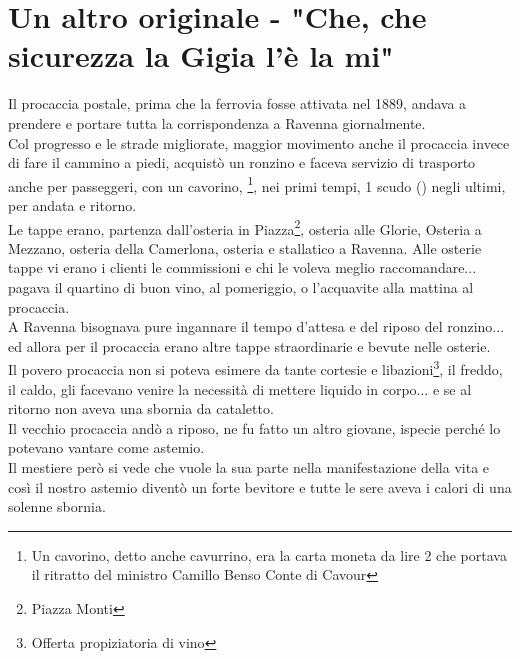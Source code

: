 
\chapter{Un altro originale - "Che, che sicurezza la Gigia l'è la mi"}
Il procaccia postale, prima che la ferrovia fosse attivata nel 1889, andava a prendere e portare tutta la corrispondenza a Ravenna giornalmente.\\
Col progresso e le strade migliorate, maggior movimento anche il procaccia invece di fare il cammino a piedi, acquistò un ronzino e faceva servizio di trasporto anche per passeggeri, con un cavorino, \normalfont \:\:\footnote{Un cavorino, detto anche cavurrino, era la carta moneta da lire 2 che portava il ritratto del ministro Camillo Benso Conte di Cavour}, nei primi tempi, 1 scudo (\normalfont \:\:) negli ultimi, per andata e ritorno. \\
Le tappe erano, partenza dall'osteria in Piazza\footnote{Piazza Monti}, osteria alle Glorie, Osteria a Mezzano, osteria della Camerlona, osteria e stallatico a Ravenna. Alle osterie tappe vi erano i clienti le commissioni e chi le voleva meglio raccomandare... pagava il quartino di buon vino, al pomeriggio, o l'acquavite alla mattina al procaccia.\\
A Ravenna bisognava pure ingannare il tempo d'attesa e del riposo del ronzino... ed allora per il procaccia erano altre tappe straordinarie e bevute nelle osterie.\\
Il povero procaccia non si poteva esimere da tante cortesie e libazioni\footnote{Offerta propiziatoria di vino}, il freddo, il caldo, gli facevano venire la necessità di mettere liquido in corpo... e se al ritorno non aveva una sbornia da cataletto.\\
Il vecchio procaccia andò a riposo, ne fu fatto un altro giovane, ispecie perché lo potevano vantare come astemio.\\
Il mestiere però si vede che vuole la sua parte nella manifestazione della vita e così il nostro astemio diventò un forte bevitore e tutte le sere aveva i calori di una solenne sbornia.\\
